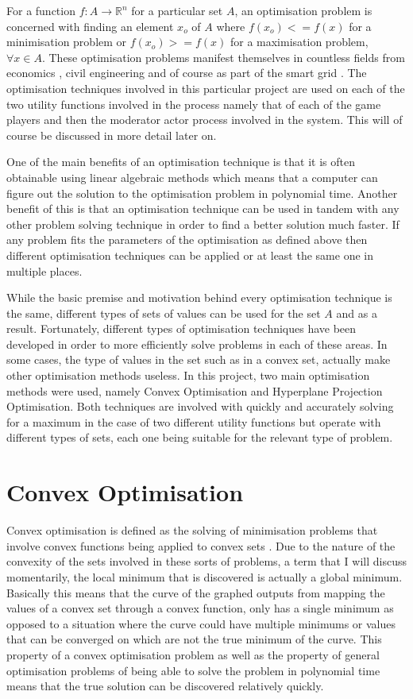 \documentclass[a4paper, notitlepage]{report}
\begin{document}
For a function \(f \colon A \rightarrow \mathbb{R}^n\) for a particular set \(A\),
an optimisation problem is concerned with finding an element \(x_o\) of \(A\) where
\(f(x_o) <= f(x)\) for a minimisation problem or \(f(x_o) >= f(x)\) for a
maximisation problem, \(\forall x \in A\). These optimisation problems manifest
themselves in countless fields from economics \cite{dixit1990optimization}, civil
engineering \cite{piryonesi2017mathematical} and of course as part of the smart
grid \cite{ahat2013smart}. The optimisation techniques involved in this particular
project are used on each of the two utility functions involved in the process
namely that of each of the game players and then the moderator actor process
involved in the system. This will of course be discussed in more detail later on.

One of the main benefits of an optimisation technique is that it is often
obtainable using linear algebraic methods which means that a computer can figure
out the solution to the optimisation problem in polynomial time. Another benefit
of this is that an optimisation technique can be used in tandem with any other
problem solving technique in order to find a better solution much faster. If any
problem fits the parameters of the optimisation as defined above then different
optimisation techniques can be applied or at least the same one in multiple
places.

While the basic premise and motivation behind every optimisation technique is
the same, different types of sets of values can be used for the set \(A\) and as a
result. Fortunately, different types of optimisation techniques have been
developed in order to more efficiently solve problems in each of these areas. In
some cases, the type of values in the set such as in a convex set, actually make
other optimisation methods useless. In this project, two main optimisation
methods were used, namely Convex Optimisation and Hyperplane Projection
Optimisation. Both techniques are involved with quickly and accurately solving
for a maximum in the case of two different utility functions but operate with
different types of sets, each one being suitable for the relevant type of problem.
\section{Convex Optimisation}
\label{sec:org68f9175}
Convex optimisation is defined as the solving of minimisation problems
that involve convex functions being applied to convex sets \cite{boyd2004convex}.
Due to the nature of the convexity of the sets involved in these sorts of
problems, a term that I will discuss momentarily, the local minimum that is
discovered is actually a global minimum. Basically this means that the curve of
the graphed outputs from mapping the values of a convex set through a convex
function, only has a single minimum as opposed to a situation where the curve
could have multiple minimums or values that can be converged on which are not
the true minimum of the curve. This property of a convex optimisation problem as
well as the property of general optimisation problems of being able to solve the
problem in polynomial time means that the true solution can be discovered
relatively quickly.
\end{document}

